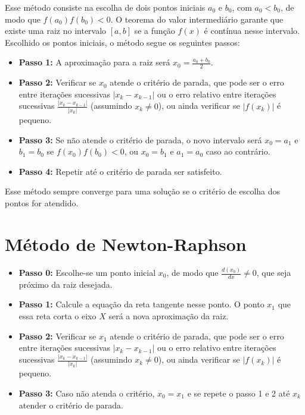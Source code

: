 \documentclass[12pt, a4paper]{report}
\begin{document}
Esse método consiste na escolha de dois pontos iniciais $a_0$ e $b_0$, com $a_0 < b_0$, de modo que $f(a_0)f(b_0)<0$. O teorema do valor intermediário garante que existe uma raiz no intervalo $[a,b]$ se a função $f(x)$ é contínua nesse intervalo. Escolhido os pontos iniciais, o método segue os seguintes passos:

\begin{itemize}
    \item \textbf{Passo 1:} A aproximação para a raiz será $x_0 = \frac{a_0+b_0}{2}$.
    
    \item \textbf{Passo 2:} Verificar se $x_0$ atende o critério de parada, que pode ser o erro entre iterações sucessivas $|x_k - x_{k-1}|$ ou o erro relativo entre iterações sucessivas $\frac{|x_k - x_{k-1}|}{|x_k|}$ (assumindo $x_k \neq 0$), ou ainda verificar se $|f(x_k)|$ é pequeno.

    \item \textbf{Passo 3:} Se não atende o critério de parada, o novo intervalo será $x_0 = a_1$ e $b_1 = b_0$ se $f(x_0)f(b_0)<0$, ou $x_0 = b_1$ e $a_1 = a_0$ caso ao contrário.
    
    \item \textbf{Passo 4:} Repetir até o critério de parada ser satisfeito.
\end{itemize}

Esse método sempre converge para uma solução se o critério de escolha dos pontos for atendido.

\section{Método de Newton-Raphson}

\begin{itemize}
    \item \textbf{Passo 0:} Escolhe-se um ponto inicial $x_0$, de modo que $\frac{d(x_0)}{dx} \neq 0$, que seja próximo da raiz desejada.

    \item \textbf{Passo 1:} Calcule a equação da reta tangente nesse ponto. O ponto $x_1$ que essa reta corta o eixo $X$ será a nova aproximação da raiz.

    \item \textbf{Passo 2:} Verificar se $x_1$ atende o critério de parada, que pode ser o erro entre iterações sucessivas $|x_k - x_{k-1}|$ ou o erro relativo entre iterações sucessivas $\frac{|x_k - x_{k-1}|}{|x_k|}$ (assumindo $x_k \neq 0$), ou ainda verificar se $|f(x_k)|$ é pequeno.

    \item \textbf{Passo 3:} Caso não atenda o critério, $x_0 = x_1$ e se repete o passo 1 e 2 até $x_k$ atender o critério de parada. 

\end{itemize}
 
\end{document}
